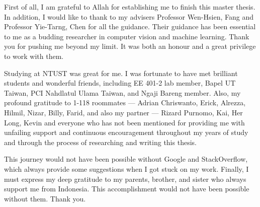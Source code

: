 First of all, I am grateful to Allah for establishing me to finish this master thesis. In addition, I would like to thank to my advisers Professor Wen-Hsien, Fang and Professor Yie-Tarng, Chen for all the guidance. Their guidance has been essential  to me  as a budding researcher in computer vision and machine learning. Thank you for pushing me beyond my limit. It was both an honour and a great privilege to work with them.

Studying at NTUST was great for me. I was fortunate to have met brilliant students and wonderful friends, including EE 401-2 lab member, Bapel UT Taiwan, PCI Nahdlatul Ulama Taiwan, and Ngaji Bareng member. Also, my profound gratitude to 1-118 roommates — Adrian Chriswanto, Erick, Alrezza, Hilmil, Nizar, Billy, Farid, and also my partner — Rizard Purnomo, Kai, Her Long, Kevin and everyone who has not been mentioned for providing me with unfailing support and continuous encouragement throughout my years of study and through the process of researching and writing this thesis. 

This journey would not have been possible without Google and StackOverflow, which always provide some suggestions when I got stuck on my work. Finally, I must express my deep gratitude to my parents, brother, and sister who always support me from Indonesia.  This accomplishment would not have been possible without them. Thank you.